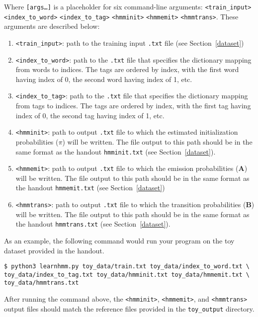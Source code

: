 \documentclass[11pt,addpoints,answers]{exam}
\begin{document}
Where \texttt{[args\dots]} is a placeholder for six command-line arguments: \texttt{<train\_input>} \texttt{<index\_to\_word>} \texttt{<index\_to\_tag>} \texttt{<hmminit>} \texttt{<hmmemit>} \texttt{<hmmtrans>}. These arguments are described below:
\begin{enumerate}
    \item \texttt{<train\_input>}: path to the training input \texttt{.txt} file (see Section~\ref{dataset})
    \item \texttt{<index\_to\_word>}: path to the \texttt{.txt} file that specifies the dictionary mapping from words to indices. The tags are ordered by index, with the first word having index of 0, the second word having index of 1, etc.
    \item \texttt{<index\_to\_tag>}: path to the \texttt{.txt} file that specifies the dictionary mapping from tags to indices. The tags are ordered by index, with the first tag having index of 0, the second tag having index of 1, etc.
    \item \texttt{<hmminit>}: path to output \texttt{.txt} file to which the estimated initialization probabilities (\boldmath${\pi}$) will be written. The file output to this path should be in the same format as the handout \texttt{hmminit.txt} (see Section~\ref{dataset}).
    \item \texttt{<hmmemit>}: path to output \texttt{.txt} file to which the emission probabilities ($\mathbf A$) will be written. The file output to this path should be in the same format as the handout \texttt{hmmemit.txt} (see Section~\ref{dataset})
    \item \texttt{<hmmtrans>}: path to output \texttt{.txt} file to which the transition probabilities ($\mathbf B$) will be written. The file output to this path should be in the same format as the handout \texttt{hmmtrans.txt} (see Section~\ref{dataset}).
\end{enumerate}
\vspace{0.2 in}
As an example, the following command would run your program on the toy dataset provided in the
handout.
\begin{lstlisting}
$ python3 learnhmm.py toy_data/train.txt toy_data/index_to_word.txt \ 
toy_data/index_to_tag.txt toy_data/hmminit.txt toy_data/hmmemit.txt \ 
toy_data/hmmtrans.txt
\end{lstlisting}

After running the command above, the \texttt{<hmminit>}, \texttt{<hmmemit>}, and \texttt{<hmmtrans>} output files should match the reference files provided in the \texttt{toy\_output} directory.
\end{document}
